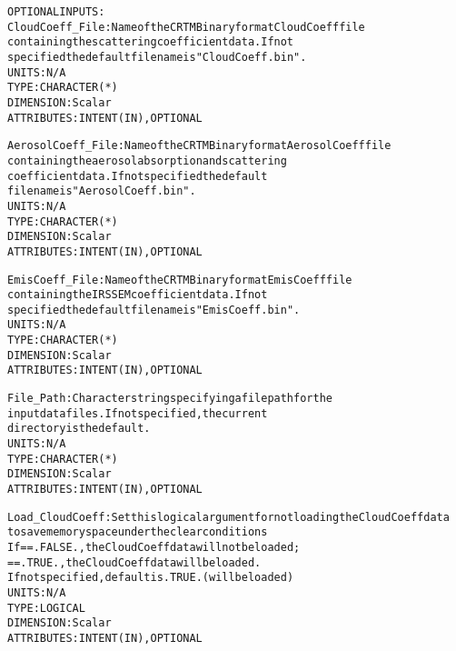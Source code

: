 \begin{alltt}
  OPTIONAL INPUTS:
        CloudCoeff_File:    Name of the CRTM Binary format CloudCoeff file
                            containing the scattering coefficient data. If not
                            specified the default filename is "CloudCoeff.bin".
                            UNITS:      N/A
                            TYPE:       CHARACTER(*)
                            DIMENSION:  Scalar
                            ATTRIBUTES: INTENT(IN), OPTIONAL
 
        AerosolCoeff_File:  Name of the CRTM Binary format AerosolCoeff file
                            containing the aerosol absorption and scattering
                            coefficient data. If not specified the default
                            filename is "AerosolCoeff.bin".
                            UNITS:      N/A
                            TYPE:       CHARACTER(*)
                            DIMENSION:  Scalar
                            ATTRIBUTES: INTENT(IN), OPTIONAL
 
        EmisCoeff_File:     Name of the CRTM Binary format EmisCoeff file
                            containing the IRSSEM coefficient data. If not
                            specified the default filename is "EmisCoeff.bin".
                            UNITS:      N/A
                            TYPE:       CHARACTER(*)
                            DIMENSION:  Scalar
                            ATTRIBUTES: INTENT(IN), OPTIONAL
 
        File_Path:          Character string specifying a file path for the
                            input data files. If not specified, the current
                            directory is the default.
                            UNITS:      N/A
                            TYPE:       CHARACTER(*)
                            DIMENSION:  Scalar
                            ATTRIBUTES: INTENT(IN), OPTIONAL
 
        Load_CloudCoeff:    Set this logical argument for not loading the CloudCoeff data
                            to save memory space under the clear conditions 
                            If == .FALSE., the CloudCoeff data will not be loaded;
                               == .TRUE.,  the CloudCoeff data will be loaded.
                            If not specified, default is .TRUE. (will be loaded)
                            UNITS:      N/A
                            TYPE:       LOGICAL
                            DIMENSION:  Scalar
                            ATTRIBUTES: INTENT(IN), OPTIONAL
 

\end{alltt}

